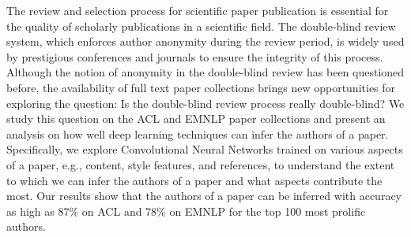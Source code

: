 The review and selection process for scientific paper publication is essential for the quality of scholarly publications in a scientific field. The double-blind review system, which enforces author anonymity during the review period, is widely used by prestigious conferences and journals to ensure the integrity of this process. Although the notion of anonymity in the double-blind review has been questioned before, the availability of full text paper collections brings new opportunities for exploring the question: Is the double-blind review process really double-blind? We study this question on the ACL and EMNLP  paper collections and present an analysis on how well deep learning techniques can infer the authors of a paper. Specifically, we explore Convolutional Neural Networks trained on various aspects of a paper, e.g., content, style features, and references, to understand the extent to which we can infer the authors of a paper and what aspects contribute the most.  Our results show that the authors of a paper can be inferred with accuracy as high as 87\% on ACL and 78\% on EMNLP for the top 100 most prolific authors.